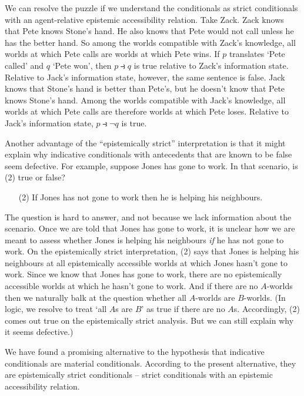 We can resolve the puzzle if we understand the conditionals as strict
conditionals with an agent-relative epistemic accessibility relation. Take Zack.
Zack knows that Pete knows Stone's hand. He also knows that Pete would not call
unless he has the better hand. So among the worlds compatible with Zack's
knowledge, all worlds at which Pete calls are worlds at which Pete wins. If $p$
translates `Pete called' and $q$ `Pete won', then $p \strictif q$ is true
relative to Zack's information state. Relative to Jack's information state,
however, the same sentence is false. Jack knows that Stone's hand is better than
Pete's, but he doesn't know that Pete knows Stone's hand. Among the worlds
compatible with Jack's knowledge, all worlds at which Pete calls are therefore
worlds at which Pete loses. Relative to Jack's information state,
$p \strictif \neg q$ is true.

Another advantage of the ``epistemically strict'' interpretation is that it
might explain why indicative conditionals with antecedents that are known to be
false seem defective. For example, suppose Jones has gone to work. In that
scenario, is (2) true or false?
\begin{enumerate}[leftmargin=10mm]
  \item[(2)] If Jones has not gone to work then he is helping his neighbours.
\end{enumerate}
The question is hard to answer, and not because we lack information about the
scenario. Once we are told that Jones has gone to work, it is unclear how we are
meant to assess whether Jones is helping his neighbours \emph{if} he has not
gone to work. On the epistemically strict interpretation, (2) says that Jones is
helping his neighbours at all epistemically accessible worlds at which Jones
hasn't gone to work. Since we know that Jones has gone to work, there are no
epistemically accessible worlds at which he hasn't gone to work. And if there
are no $A$-worlds then we naturally balk at the question whether all $A$-worlds
are $B$-worlds. (In logic, we resolve to treat `all $A$s are $B$' as true if
there are no $A$s. Accordingly, (2) comes out true on the epistemically strict
analysis. But we can still explain why it seems defective.)

We have found a promising alternative to the hypothesis that indicative
conditionals are material conditionals. According to the present alternative,
they are epistemically strict conditionals -- strict conditionals with an
epistemic accessibility relation.


